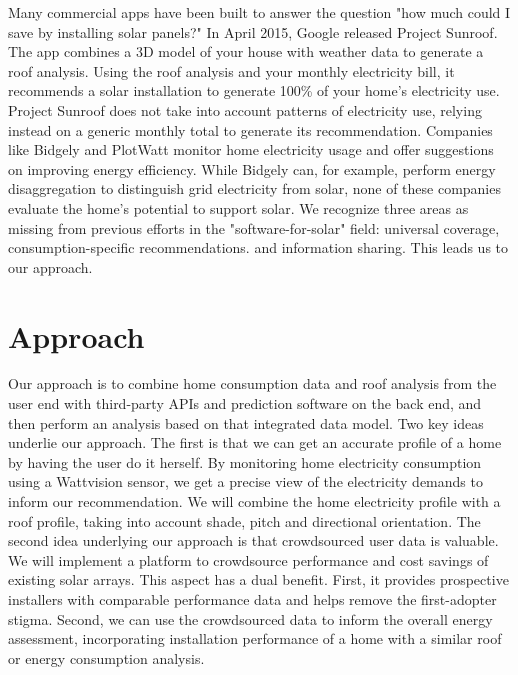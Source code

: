 \documentclass[pageno]{jpaper}
\begin{document}
\indent Many commercial apps have been built to answer the question "how much could I save by installing solar panels?" In April 2015, Google released Project Sunroof. The app combines a 3D model of your house with weather data to generate a roof analysis. Using the roof analysis and your monthly electricity bill, it recommends a solar installation to generate 100\% of your home's electricity use. Project Sunroof does not take into account patterns of electricity use, relying instead on a generic monthly total to generate its recommendation. \newline
\indent Companies like Bidgely and PlotWatt monitor home electricity usage and offer suggestions on improving energy efficiency. While Bidgely can, for example, perform energy disaggregation to distinguish grid electricity from solar, none of these companies evaluate the home's potential to support solar. \newline
\indent We recognize three areas as missing from previous efforts in the "software-for-solar" field: universal coverage, consumption-specific recommendations. and information sharing. This leads us to our approach.

\section{Approach}

\indent Our approach is to combine home consumption data and roof analysis from the user end with third-party APIs and prediction software on the back end, and then perform an analysis based on that integrated data model. \newline
\indent Two key ideas underlie our approach. The first is that we can get an accurate profile of a home by having the user do it herself. By monitoring home electricity consumption using a Wattvision sensor, we get a precise view of the electricity demands to inform our recommendation. We will combine the home electricity profile with a roof profile, taking into account shade, pitch and directional orientation. \newline
\indent The second idea underlying our approach is that crowdsourced user data is valuable. We will implement a platform to crowdsource performance and cost savings of existing solar arrays. This aspect has a dual benefit. First, it provides prospective installers with comparable performance data and helps remove the first-adopter stigma. Second, we can use the crowdsourced data to inform the overall energy assessment, incorporating installation performance of a home with a similar roof or energy consumption analysis.
\end{document}
